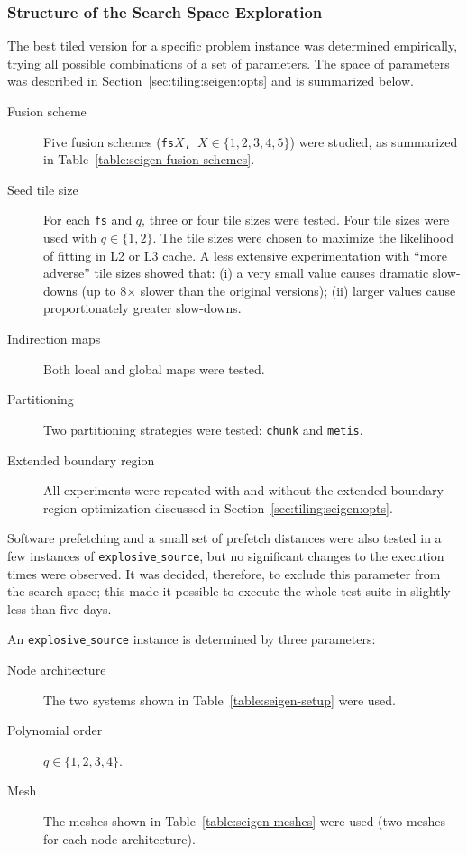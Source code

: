 \subsubsection{Structure of the Search Space Exploration}
The best tiled version for a specific problem instance was determined empirically, trying all possible combinations of a set of parameters. The space of parameters was described in Section~\ref{sec:tiling:seigen:opts} and is summarized below.

\begin{description}
\item[Fusion scheme] Five fusion schemes ({\tt fs$X$, $X \in \lbrace 1, 2, 3, 4, 5\rbrace$}) were studied, as summarized in Table~\ref{table:seigen-fusion-schemes}.
\item[Seed tile size] For each {\tt fs} and $q$, three or four tile sizes were tested. Four tile sizes were used with $q \in \lbrace 1, 2\rbrace$. The tile sizes were chosen to maximize the likelihood of fitting in L2 or L3 cache. A less extensive experimentation with ``more adverse'' tile sizes showed that: (i) a very small value causes dramatic slow-downs (up to 8$\times$ slower than the original versions); (ii) larger values cause proportionately greater slow-downs.
\item[Indirection maps] Both local and global maps were tested.
\item[Partitioning] Two partitioning strategies were tested: {\tt chunk} and {\tt metis}.
\item[Extended boundary region] All experiments were repeated with and without the extended boundary region optimization discussed in Section~\ref{sec:tiling:seigen:opts}.
\end{description}

Software prefetching and a small set of prefetch distances were also tested in a few instances of {\tt explosive$\_$source}, but no significant changes to the execution times were observed. It was decided, therefore, to exclude this parameter from the search space; this made it possible to execute the whole test suite in slightly less than five days. 

An {\tt explosive$\_$source} instance is determined by three parameters:

\begin{description}
\item[Node architecture] The two systems shown in Table~\ref{table:seigen-setup} were used.
\item[Polynomial order] $q \in \lbrace 1, 2, 3, 4\rbrace$.
\item[Mesh] The meshes shown in Table~\ref{table:seigen-meshes} were used (two meshes for each node architecture).
\end{description}

